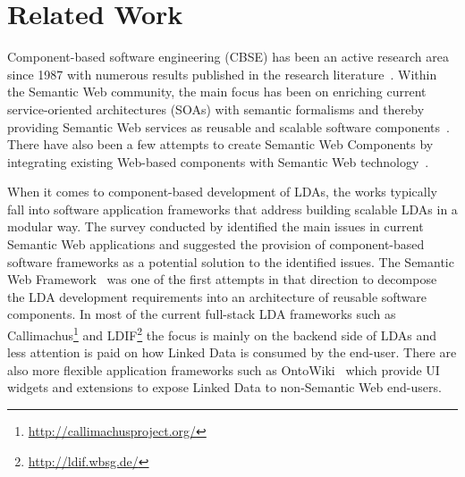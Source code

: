 \documentclass{acm_proc_article-sp}
\begin{document}
\section{Related Work}
Component-based software engineering (CBSE) has been an active research area since 1987 with numerous results published in the research literature~\cite{Vale2015}.
Within the Semantic Web community, the main focus has been on enriching current service-oriented architectures (SOAs) with semantic formalisms and thereby providing Semantic Web services as reusable and scalable software components~\cite{sws2015}.
There have also been a few attempts to create Semantic Web Components by integrating existing Web-based components with Semantic Web technology~\cite{pahl2011,HartigKF08}.

When it comes to component-based development of LDAs, the works typically fall into 
software application frameworks that address building scalable LDAs in a modular way.
The survey conducted by \cite{SWASurvey09} identified the main issues in current Semantic Web applications and suggested the provision of component-based software frameworks as a potential solution to the identified issues.
The Semantic Web Framework~\cite{swFramework2008} was one of the first attempts in that direction to decompose the LDA development requirements into an architecture of reusable software components.
In most of the current full-stack LDA frameworks such as Callimachus\footnote{\url{http://callimachusproject.org/}} and LDIF\footnote{\url{http://ldif.wbsg.de/}} the focus is mainly on the backend side of LDAs and less attention is paid on how Linked Data is consumed by the end-user. 
There are also more flexible application frameworks such as OntoWiki~\cite{ontowiki-swj} which provide UI widgets and extensions to expose Linked Data to non-Semantic Web end-users.
\end{document}
